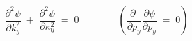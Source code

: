 \begin{equation}
{\frac{\partial^2 \psi}{\partial k^2_y}} \; +\;	
	{\frac{\partial^2 \psi}{\partial \kappa^2_y}}\; = 
		\; 0\qquad\qquad\left( 	{\frac{\partial \;}{\partial p_y}}
	{\frac{\partial \psi}{\partial \overline{p_y}}} \; = \; 0\right) 
\label{eq:holomorphic2}
\end{equation}

